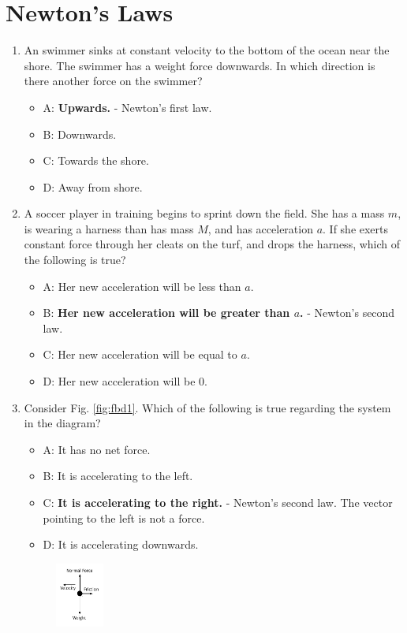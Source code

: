 \documentclass[10pt]{article}
\begin{document}
\section{Newton's Laws}
\begin{enumerate}
\small
\item An swimmer sinks at constant velocity to the bottom of the ocean near the shore.  The swimmer has a weight force downwards.  In which direction is there another force on the swimmer?
\begin{itemize}
\item A: \textbf{Upwards.} - Newton's first law.
\item B: Downwards.
\item C: Towards the shore.
\item D: Away from shore.
\end{itemize}
\item A soccer player in training begins to sprint down the field.  She has a mass $m$, is wearing a harness than has mass $M$, and has acceleration $a$.  If she exerts constant force through her cleats on the turf, and drops the harness, which of the following is true?
\begin{itemize}
\item A: Her new acceleration will be less than $a$.
\item B: \textbf{Her new acceleration will be greater than $a$.} - Newton's second law.
\item C: Her new acceleration will be equal to $a$.
\item D: Her new acceleration will be 0.
\end{itemize}
\item Consider Fig. \ref{fig:fbd1}.  Which of the following is true regarding the system in the diagram?
\begin{itemize}
\item A: It has no net force.
\item B: It is accelerating to the left.
\item C: \textbf{It is accelerating to the right.} - Newton's second law.  The vector pointing to the left is not a force.
\item D: It is accelerating downwards. 
\end{itemize}
\begin{figure}[h]
\centering
\includegraphics[width=0.15\textwidth]{figures/FBD3.pdf}

\end{figure}
\end{enumerate}
\end{document}
